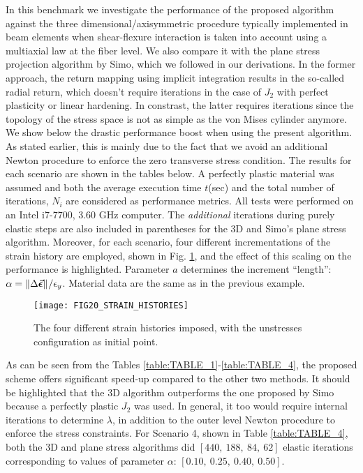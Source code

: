 In this benchmark we investigate the performance of the proposed algorithm 
against the three dimensional/axisymmetric procedure typically implemented in 
beam elements when shear-flexure interaction is taken into account using a 
multiaxial law at the fiber level. We also compare it with the plane stress 
projection 
algorithm by Simo\cite{Simo1985}, which we followed in our derivations. In the 
former approach, the return mapping using implicit integration results in 
the so-called radial return, which doesn't require iterations in the case of 
$J_2$ with perfect plasticity or linear hardening\cite{Wilkins1963}. In 
constrast, the latter requires iterations since the topology of the stress 
space is not as simple as the von Mises cylinder anymore. We show below the 
drastic performance boost when 
using the present algorithm. As stated earlier, this is mainly due to 
the fact that we avoid an additional Newton procedure to enforce the zero 
transverse stress condition. The results for each scenario are shown in the 
tables below. A perfectly plastic material was assumed and both the average 
execution time $t$(sec) and the total number of iterations, $N_i$ are 
considered as performance metrics. All tests were performed on an Intel 
i7-7700, 3.60 GHz computer. The \textit{additional} iterations during 
purely elastic steps are also included in parentheses for the 3D and Simo's 
plane stress algorithm.  Moreover, for each scenario, four 
different incrementations of the strain history are employed, shown in Fig. 
\ref{fig:FIG20_STRAIN_HISTORIES}, and the effect of 
this scaling on the performance is highlighted. Parameter $a$ determines the 
increment ``length'': $\alpha = 
\Vert\Delta\vec{\bm{\epsilon}}\Vert^{}/\epsilon_y$. Material data are the same as 
in the previous example. 

\begin{figure}[t]
	\centering
	\texttt{[image: FIG20\_STRAIN\_HISTORIES]}
	\caption{The four different strain histories imposed, with the unstresses 
		configuration as initial point.}
	\label{fig:FIG20_STRAIN_HISTORIES}
\end{figure}

As can be seen from the Tables \ref{table:TABLE_1}-\ref{table:TABLE_4}, the 
proposed scheme offers significant speed-up compared to the other two methods. 
It should be highlighted that the 3D algorithm outperforms the one proposed by 
Simo because a perfectly plastic $J_2$ was used. In 
general, it too would require internal iterations to determine $\lambda$, in 
addition to the outer level Newton procedure to enforce the stress constraints. 
For Scenario 4, shown in Table \ref{table:TABLE_4}, both the 3D and plane 
stress algorithms did $[440,\ 188,\ 84,\ 62]$ elastic iterations corresponding 
to values of parameter $\alpha$: $[0.10,\ 0.25,\ 0.40,\ 0.50]$.




